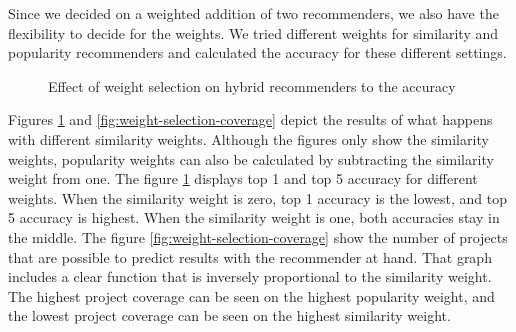 Since we decided on a weighted addition of two recommenders, we also have the flexibility to decide for the weights. We tried different weights for similarity and popularity recommenders and calculated the accuracy for these different settings. 


\begin{figure}[htpb]
	\centering
	
	\exampleA
	\exampleB
	\caption[Weight figure]{Effect of weight selection on hybrid recommenders to the accuracy}\label{fig:weight-selection}
\end{figure}

Figures \ref{fig:weight-selection} and \ref{fig:weight-selection-coverage}  depict the results of what happens with different similarity weights. Although the figures only show the similarity weights, popularity weights can also be calculated by subtracting the similarity weight from one. The figure \ref{fig:weight-selection} displays top 1 and top 5 accuracy for different weights. When the similarity weight is zero, top 1 accuracy is the lowest, and top 5 accuracy is highest. When the similarity weight is one, both accuracies stay in the middle. The figure \ref{fig:weight-selection-coverage} show the number of projects that are possible to predict results with the recommender at hand. That graph includes a clear function that is inversely proportional to the similarity weight. The highest project coverage can be seen on the highest popularity weight, and the lowest project coverage can be seen on the highest similarity weight.


